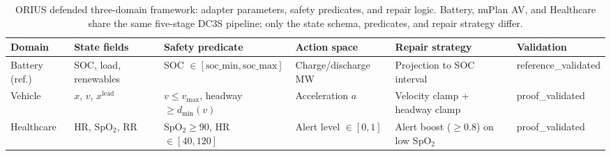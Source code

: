 \begin{table}[htbp]
\centering
\small
\caption{ORIUS defended three-domain framework: adapter parameters, safety predicates, and repair logic. Battery, nuPlan AV, and Healthcare share the same five-stage DC3S pipeline; only the state schema, predicates, and repair strategy differ.}
\label{tab:universal_adapter_params}
\setlength{\tabcolsep}{4pt}
\renewcommand{\arraystretch}{1.05}
\begin{tabular}{llllll}
\toprule
\textbf{Domain} & \textbf{State fields} & \textbf{Safety predicate} & \textbf{Action space} & \textbf{Repair strategy} & \textbf{Validation} \\
\midrule
Battery (ref.) &
  SOC, load, renewables &
  SOC $\in [\text{soc\_min}, \text{soc\_max}]$ &
  Charge/discharge MW &
  Projection to SOC interval &
  reference\_validated \\
Vehicle &
  $x$, $v$, $x^{\text{lead}}$ &
  $v \leq v_{\max}$, headway $\geq d_{\min}(v)$ &
  Acceleration $a$ &
  Velocity clamp + headway clamp &
  proof\_validated \\
Healthcare &
  HR, SpO$_2$, RR &
  SpO$_2 \geq 90$, HR $\in [40,120]$ &
  Alert level $\in [0,1]$ &
  Alert boost ($\geq$0.8) on low SpO$_2$ &
  proof\_validated \\
\bottomrule
\end{tabular}
\end{table}

